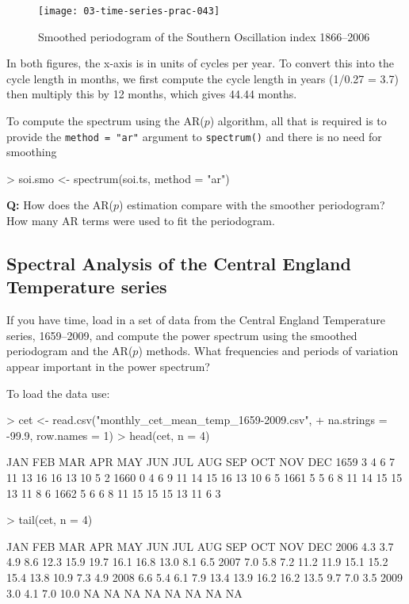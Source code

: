 \documentclass[a4paper,10pt]{article}
\begin{document}
\begin{figure}[t]
\begin{center}
\texttt{[image: 03-time-series-prac-043]}
\caption{\label{SOI-smooth-periodogram}Smoothed periodogram of the Southern Oscillation index 1866--2006}
\end{center}
\end{figure}

In both figures, the x-axis is in units of cycles per year. To convert this into the cycle length in months, we first compute the cycle length in years (1/0.27 = 3.7) then multiply this by 12 months, which gives 44.44 months.

To compute the spectrum using the AR($p$) algorithm, all that is required is to provide the \texttt{method = "ar"} argument to \texttt{spectrum()} and there is no need for smoothing
\begin{Schunk}
\begin{Sinput}
> soi.smo <- spectrum(soi.ts, method = "ar")
\end{Sinput}
\end{Schunk}

\textbf{Q:} How does the AR($p$) estimation compare with the smoother periodogram? How many AR terms were used to fit the periodogram.

\subsection{Spectral Analysis of the Central England Temperature series}
If you have time, load in a set of data from the Central England Temperature series, 1659--2009, and compute the power spectrum using the smoothed periodogram and the AR($p$) methods. What frequencies and periods of variation appear important in the power spectrum?

To load the data use:

\begin{Schunk}
\begin{Sinput}
> cet <- read.csv("monthly_cet_mean_temp_1659-2009.csv",
+                 na.strings = -99.9, row.names = 1)
> head(cet, n = 4)
\end{Sinput}
\begin{Soutput}
     JAN FEB MAR APR MAY JUN JUL AUG SEP OCT NOV DEC
1659   3   4   6   7  11  13  16  16  13  10   5   2
1660   0   4   6   9  11  14  15  16  13  10   6   5
1661   5   5   6   8  11  14  15  15  13  11   8   6
1662   5   6   6   8  11  15  15  15  13  11   6   3
\end{Soutput}
\begin{Sinput}
> tail(cet, n = 4)
\end{Sinput}
\begin{Soutput}
     JAN FEB MAR  APR  MAY  JUN  JUL  AUG  SEP  OCT NOV DEC
2006 4.3 3.7 4.9  8.6 12.3 15.9 19.7 16.1 16.8 13.0 8.1 6.5
2007 7.0 5.8 7.2 11.2 11.9 15.1 15.2 15.4 13.8 10.9 7.3 4.9
2008 6.6 5.4 6.1  7.9 13.4 13.9 16.2 16.2 13.5  9.7 7.0 3.5
2009 3.0 4.1 7.0 10.0   NA   NA   NA   NA   NA   NA  NA  NA
\end{Soutput}
\end{Schunk}
\end{document}
